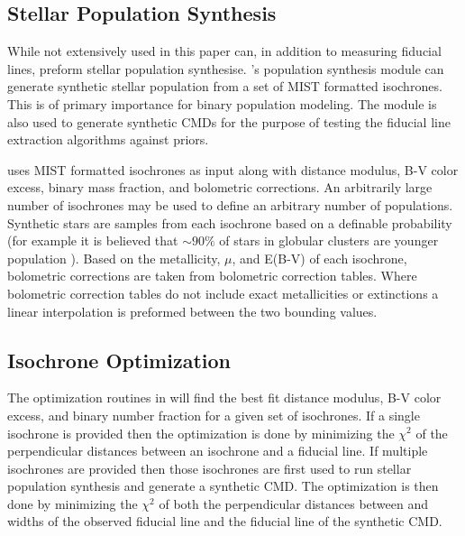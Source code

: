 \subsection{Stellar Population Synthesis}
While not extensively used in this paper \fidanka can, in addition to measuring fiducial
lines, preform stellar population synthesise. \fidanka's population synthesis
module can generate synthetic stellar population from a set of MIST formatted
isochrones. This is of primary importance for binary population modeling. The
module is also used to generate synthetic CMDs for the purpose of testing the
fiducial line extraction algorithms against priors.

\fidanka uses MIST formatted isochrones \citep{Dotter2016} as input along
with distance modulus, B-V color excess, binary mass fraction, and bolometric
corrections. An arbitrarily large number of isochrones may be used to define an
arbitrary number of populations. Synthetic stars are samples from each
isochrone based on a definable probability (for example it is believed that
$\sim90\%$ of stars in globular clusters are younger population
\citep[e.g.][]{Suntzeff1996, Carretta2013}). Based on the metallicity, $\mu$, and E(B-V) of each
isochrone, bolometric corrections are taken from bolometric correction tables.
Where bolometric correction tables do not include exact metallicities or
extinctions a linear interpolation is preformed between the two bounding
values. 

\subsection{Isochrone Optimization}
The optimization routines in \fidanka will find the best fit distance modulus,
B-V color excess, and binary number fraction for a given set of isochrones. If
a single isochrone is provided then the optimization is done by minimizing the
$\chi^2$ of the perpendicular distances between an isochrone and a fiducial
line. If multiple isochrones are provided then those isochrones are first used
to run stellar population synthesis and generate a synthetic CMD. The
optimization is then done by minimizing the $\chi^2$ of both the perpendicular
distances between and widths of the observed fiducial line and the fiducial
line of the synthetic CMD.



